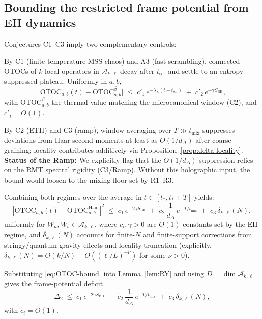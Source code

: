 \documentclass[11pt,a4paper]{article}
\theoremstyle{plain}
\theoremstyle{definition}
\theoremstyle{remark}
\begin{document}
\subsection*{Bounding the restricted frame potential from EH dynamics}
Conjectures C1--C3 imply two complementary controls:
\begin{description}[leftmargin=*,itemsep=0.3em]
  \item[(Early-to-intermediate times, $t_\ast\lesssim t\ll t_{\mathrm{Th}}$)] By C1 (finite-temperature MSS chaos) and A3 (fast scrambling), connected OTOCs of $k$-local operators in $\mathscr{A}_{k,\ell}$ decay after $t_{\mathrm{scr}}$ and settle to an entropy-suppressed plateau.
Uniformly in $a,b$,
  \[
    \big| \mathrm{OTOC}_{a,b}(t) - \mathrm{OTOC}^{\beta}_{a,b} \big| \;\le\; c'_1\, e^{-\lambda_L (t-t_{\mathrm{scr}})} \;+\; c'_2\, e^{-\gamma S_{\mathrm{BH}}}\!,
  \]
  with $\mathrm{OTOC}^{\beta}_{a,b}$ the thermal value matching the microcanonical window (C2), and $c'_i=O(1)$.
  \item[(Late times, $t\gtrsim t_{\mathrm{Th}}$)] By C2 (ETH) and C3 (ramp), window-averaging over $T\gg t_{\mathrm{mix}}$ suppresses deviations from Haar second moments at least as $O(1/d_\Delta)$ after coarse-graining; locality contributes additively via Proposition~\ref{prop:delta-locality}.
\textbf{Status of the Ramp:} We explicitly flag that the $O(1/d_\Delta)$ suppression relies on the RMT spectral rigidity (C3/Ramp). Without this holographic input, the bound would loosen to the mixing floor set by R1--R3.
\end{description}
Combining both regimes over the average in $t\in[t_\ast,t_\ast+T]$ yields:
\begin{equation}\label{eq:OTOC-bound}
 \overline{\left| \mathrm{OTOC}_{a,b}(t) - \mathrm{OTOC}^{\mathrm{Haar}}_{a,b} \right|^2}
 \;\le\; c_1\, e^{-2\gamma S_{\mathrm{BH}}} \;+\; c_2\, \frac{1}{d_\Delta}\, e^{-T/t_{\mathrm{mix}}}
 \;+\; c_3\, \delta_{k,\ell}(N),
\end{equation}
uniformly for $W_a,W_b\in\mathscr{A}_{k,\ell}$, where $c_i,\gamma>0$ are $O(1)$ constants set by the EH regime, and $\delta_{k,\ell}(N)$ accounts for finite-$N$ and finite-support corrections from stringy/quantum-gravity effects and locality truncation (explicitly, $\delta_{k,\ell}(N)=O(k/N)+O((\ell/L)^{-\nu})$ for some $\nu>0$).

Substituting \eqref{eq:OTOC-bound} into Lemma~\ref{lem:RY} and using $D=\dim \mathscr{A}_{k,\ell}$ gives the frame-potential deficit
\begin{equation}\label{eq:Delta2-bound}
 \Delta_2 \;\le\; \tilde c_1\, e^{-2\gamma S_{\mathrm{BH}}}
 \;+\; \tilde c_2\, \frac{1}{d_\Delta}\, e^{-T/t_{\mathrm{mix}}}
 \;+\; \tilde c_3\, \delta_{k,\ell}(N),
\end{equation}
with $\tilde c_i=O(1)$.
\end{document}
